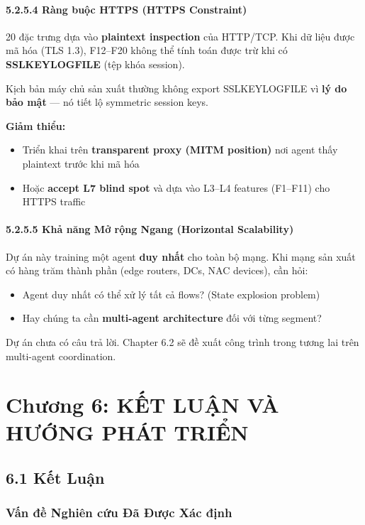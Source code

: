 \documentclass[12pt,a4paper,twoside]{report}
\begin{document}
{{{{{{{{{{{{{\subsubsection{5.2.5.4 Ràng buộc HTTPS (HTTPS Constraint)}

20 đặc trưng dựa vào \textbf{plaintext inspection} của HTTP/TCP. Khi dữ liệu được mã hóa (TLS 1.3), F12–F20 không thể tính toán được trừ khi có \textbf{SSLKEYLOGFILE} (tệp khóa session).

Kịch bản máy chủ sản xuất thường không export SSLKEYLOGFILE vì \textbf{lý do bảo mật} — nó tiết lộ symmetric session keys.

\textbf{Giảm thiểu:}
\begin{itemize}
\item Triển khai trên \textbf{transparent proxy (MITM position)} nơi agent thấy plaintext trước khi mã hóa
\item Hoặc \textbf{accept L7 blind spot} và dựa vào L3–L4 features (F1–F11) cho HTTPS traffic
\end{itemize}

\subsubsection{5.2.5.5 Khả năng Mở rộng Ngang (Horizontal Scalability)}

Dự án này training một agent \textbf{duy nhất} cho toàn bộ mạng. Khi mạng sản xuất có hàng trăm thành phần (edge routers, DCs, NAC devices), cần hỏi:
\begin{itemize}
\item Agent duy nhất có thể xử lý tất cả flows? (State explosion problem)
\item Hay chúng ta cần \textbf{multi-agent architecture} đối với từng segment?
\end{itemize}

Dự án chưa có câu trả lời. Chapter 6.2 sẽ đề xuất công trình trong tương lai trên multi-agent coordination.



\chapter{Chương 6: KẾT LUẬN VÀ HƯỚNG PHÁT TRIỂN}

\section{6.1 Kết Luận}

\subsection{Vấn đề Nghiên cứu Đã Được Xác định}

}}}}}}}}}}}}}
\end{document}
